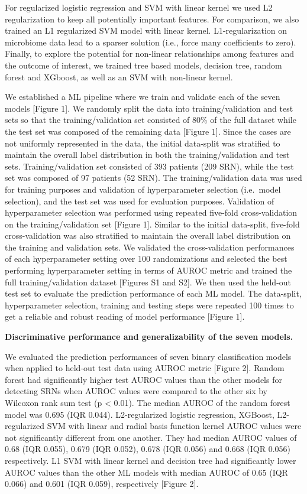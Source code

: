 \documentclass[11pt,]{article}
\begin{document}
For regularized logistic regression and SVM with linear kernel we used
L2 regularization to keep all potentially important features. For
comparison, we also trained an L1 regularized SVM model with linear
kernel. L1-regularization on microbiome data lead to a sparser solution
(i.e., force many coefficients to zero). Finally, to explore the
potential for non-linear relationships among features and the outcome of
interest, we trained tree based models, decision tree, random forest and
XGboost, as well as an SVM with non-linear kernel.

We established a ML pipeline where we train and validate each of the
seven models {[}Figure 1{]}. We randomly split the data into
training/validation and test sets so that the training/validation set
consisted of 80\% of the full dataset while the test set was composed of
the remaining data {[}Figure 1{]}. Since the cases are not uniformly
represented in the data, the initial data-split was stratified to
maintain the overall label distribution in both the training/validation
and test sets. Training/validation set consisted of 393 patients (209
SRN), while the test set was composed of 97 patients (52 SRN). The
training/validation data was used for training purposes and validation
of hyperparameter selection (i.e.~model selection), and the test set was
used for evaluation purposes. Validation of hyperparameter selection was
performed using repeated five-fold cross-validation on the
training/validation set {[}Figure 1{]}. Similar to the initial
data-split, five-fold cross-validation was also stratified to maintain
the overall label distribution on the training and validation sets. We
validated the cross-validation performances of each hyperparameter
setting over 100 randomizations and selected the best performing
hyperparameter setting in terms of AUROC metric and trained the full
training/validation dataset {[}Figures S1 and S2{]}. We then used the
held-out test set to evaluate the prediction performance of each ML
model. The data-split, hyperparameter selection, training and testing
steps were repeated 100 times to get a reliable and robust reading of
model performance {[}Figure 1{]}.

\textbf{Discriminative performance and generalizability of the seven
models.}

We evaluated the prediction performances of seven binary classification
models when applied to held-out test data using AUROC metric {[}Figure
2{]}. Random forest had significantly higher test AUROC values than the
other models for detecting SRNs when AUROC values were compared to the
other six by Wilcoxon rank sum test (p \textless{} 0.01). The median
AUROC of the random forest model was 0.695 (IQR 0.044). L2-regularized
logistic regression, XGBoost, L2-regularized SVM with linear and radial
basis function kernel AUROC values were not significantly different from
one another. They had median AUROC values of 0.68 (IQR 0.055), 0.679
(IQR 0.052), 0.678 (IQR 0.056) and 0.668 (IQR 0.056) respectively. L1
SVM with linear kernel and decision tree had significantly lower AUROC
values than the other ML models with median AUROC of 0.65 (IQR 0.066)
and 0.601 (IQR 0.059), respectively {[}Figure 2{]}.
\end{document}
